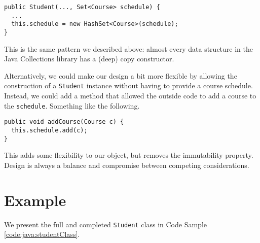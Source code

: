 \begin{verbatim}
public Student(..., Set<Course> schedule) {
  ...
  this.schedule = new HashSet<Course>(schedule);
}
\end{verbatim}

This is the same pattern we described above: almost every data
structure in the Java Collections library has a (deep) copy
constructor.  

Alternatively, we could make our design a bit more flexible by
allowing the construction of a \texttt{Student} instance
without having to provide a course schedule.  Instead, we could
add a method that allowed the outside code to add a course to
the \texttt{schedule}.  Something like the following.

\begin{verbatim}
public void addCourse(Course c) {
  this.schedule.add(c);
}
\end{verbatim}

This adds some flexibility to our object, but removes the immutability
property.  Design is always a balance and compromise between competing
considerations.

\section{Example}

We present the full and completed \texttt{Student} class in
Code Sample \ref{code:java:studentClass}.

\newpage
\inputminted[fontsize=\small,bgcolor={}]{java}{code/Student.java}


